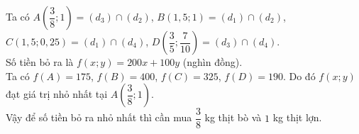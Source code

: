 \begin{bt}
{\begin{center}
	\end{center}
	Ta có $A\left(\dfrac{3}{8};1\right)=(d_3)\cap (d_2)$, $B(1{,}5;1)=(d_1)\cap (d_2)$, $C(1{,}5;0{,}25)=(d_1)\cap (d_4)$, $D\left(\dfrac{3}{5};\dfrac{7}{10}\right)=(d_3)\cap (d_4)$.\\
	Số tiền bỏ ra là $f(x;y)=200x+100y$ (nghìn đồng).\\
	Ta có $f(A)=175$, $f(B)=400$, $f(C)=325$, $f(D)=190$. Do đó $f(x;y)$ đạt giá trị nhỏ nhất tại $A\left(\dfrac{3}{8};1\right)$.\\ 
	Vậy để số tiền bỏ ra nhỏ nhất thì cần mua $\dfrac{3}{8}$ kg thịt bò và $1$ kg thịt lợn.
}
\end{bt}


